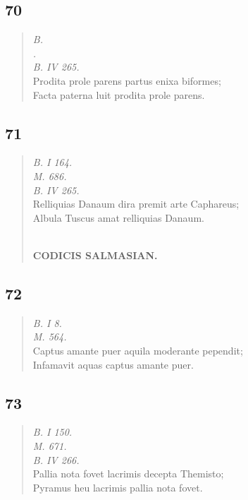 \documentclass[11pt, a4paper]{report}
\begin{document}
            \subsection*{70}
      \begin{verse}
      \textit{B.} \\ \textit{.} \\ \textit{B. IV 265.} \\ Prodita prole parens partus enixa biformes; \\ Facta paterna luit prodita prole parens. \\ 
      \end{verse}
  
            \subsection*{71}
      \begin{verse}
      \textit{B. I 164.} \\ \textit{M. 686.} \\ \textit{B. IV 265.} \\ Relliquias Danaum dira premit arte Caphareus; \\ Albula Tuscus amat relliquias Danaum. \\ 
        ﻿\pagebreak 
    \begin{center} \textbf{CODICIS SALMASIAN.} \end{center} \marginpar{[109]} 
      \end{verse}
  
            \subsection*{72}
      \begin{verse}
      \textit{B. I 8.} \\ \textit{M. 564.} \\ Captus amante puer aquila moderante pependit; \\ Infamavit aquas captus amante puer. \\ 
      \end{verse}
  
            \subsection*{73}
      \begin{verse}
      \textit{B. I 150.} \\ \textit{M. 671.} \\ \textit{B. IV 266.} \\ Pallia nota fovet lacrimis decepta Themisto; \\ Pyramus heu lacrimis pallia nota fovet. \\ 
      \end{verse}
  
\end{document}
